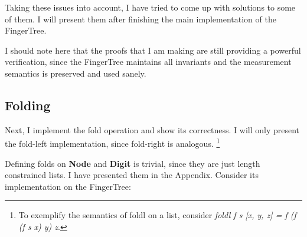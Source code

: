 \documentclass[12pt,twoside,notitlepage]{report}
\begin{document}
Taking these issues into account, I have tried to come up with solutions to some of them. I will present them after finishing the main implementation of the FingerTree.

I should note here that the proofs that I am making are still providing a powerful verification, since the FingerTree maintains all invariants and the measurement semantics is preserved and used sanely.

\subsection{Folding}
\label{sec:fold}

Next, I implement the fold operation and show its correctness. I will only present the fold-left implementation, since fold-right is analogous. \footnote{
To exemplify the semantics of foldl on a list, consider \textit{foldl f s [x, y, z] = f (f (f s x) y) z}.}

Defining folds on \textbf{Node} and \textbf{Digit} is trivial, since they are just length constrained lists. I have presented them in the Appendix. Consider its implementation on the FingerTree: 
\end{document}
